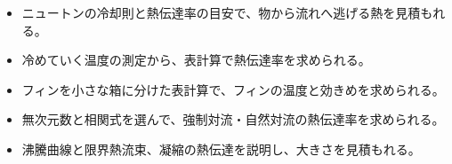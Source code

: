 \makeatletter
\newcommand\qxmheat[2]{\draw[bkOrange!85!black, line width=1.6pt, -{Stealth[length=3.2mm, width=2.6mm]}] #1 -- #2;}
\makeatother


\begin{goal}
\begin{itemize}[label={\color{bkTheme}●}, leftmargin=1.6\zw, itemsep=0pt, topsep=1pt]
\item {}\enspace ニュートンの冷却則と熱伝達率の目安で、物から流れへ逃げる熱を見積もれる。
\item {}\enspace 冷めていく温度の測定から、表計算で熱伝達率を求められる。
\item {}\enspace フィンを小さな箱に分けた表計算で、フィンの温度と効きめを求められる。
\item {}\enspace 無次元数と相関式を選んで、強制対流・自然対流の熱伝達率を求められる。
\item {}\enspace 沸騰曲線と限界熱流束、凝縮の熱伝達を説明し、大きさを見積もれる。
\end{itemize}
\end{goal}


